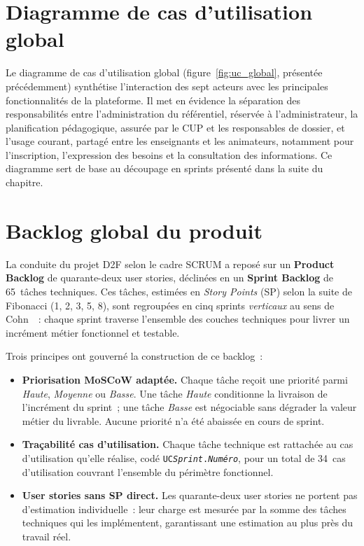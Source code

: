 \documentclass[12pt,a4paper]{report}
\begin{document}
\section{Diagramme de cas d'utilisation global}

Le diagramme de cas d'utilisation global (figure~\ref{fig:uc_global}, présentée
précédemment) synthétise l'interaction des sept acteurs avec les principales
fonctionnalités de la plateforme. Il met en évidence la séparation des
responsabilités entre l'administration du référentiel, réservée à
l'administrateur, la planification pédagogique, assurée par le CUP et les
responsables de dossier, et l'usage courant, partagé entre les enseignants et
les animateurs, notamment pour l'inscription, l'expression des besoins et la
consultation des informations. Ce diagramme sert de base au découpage en sprints
présenté dans la suite du chapitre.

\section{Backlog global du produit}
\label{sec:backlog}

La conduite du projet D2F selon le cadre SCRUM a reposé sur un \textbf{Product
Backlog} de quarante-deux user stories, déclinées en un \textbf{Sprint Backlog} de
65~tâches techniques. Ces tâches, estimées en \textit{Story Points} (SP) selon
la suite de Fibonacci (1, 2, 3, 5, 8), sont regroupées en cinq sprints
\textit{verticaux} au sens de Cohn~\cite{cohn2009succeeding}~: chaque sprint
traverse l'ensemble des couches techniques pour livrer un incrément métier
fonctionnel et testable.

\medskip

Trois principes ont gouverné la construction de ce backlog~:

\begin{itemize}[leftmargin=1.2cm]
  \item \textbf{Priorisation MoSCoW adaptée.}
  Chaque tâche reçoit une priorité parmi \textit{Haute}, \textit{Moyenne} ou
  \textit{Basse}. Une tâche \textit{Haute} conditionne la livraison de
  l'incrément du sprint~; une tâche \textit{Basse} est négociable sans
  dégrader la valeur métier du livrable. Aucune priorité n'a été abaissée
  en cours de sprint.
  \item \textbf{Traçabilité cas d'utilisation.}
  Chaque tâche technique est rattachée au cas d'utilisation qu'elle réalise,
  codé \texttt{UC\textit{Sprint}.\textit{Numéro}}, pour un total de 34~cas
  d'utilisation couvrant l'ensemble du périmètre fonctionnel.
  \item \textbf{User stories sans SP direct.}
  Les quarante-deux user stories ne portent
  pas d'estimation individuelle~: leur charge est mesurée par la somme des
  tâches techniques qui les implémentent, garantissant une estimation au plus
  près du travail réel.
\end{itemize}
\end{document}
